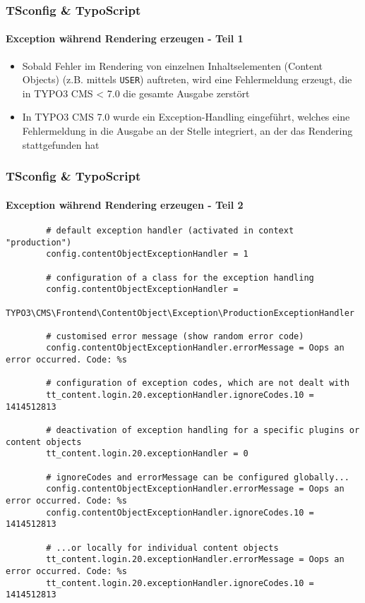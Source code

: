 \begin{frame}[fragile]
	\frametitle{TSconfig \& TypoScript}
	\framesubtitle{Exception während Rendering erzeugen - Teil 1}

	\begin{itemize}
		\item Sobald Fehler im Rendering von einzelnen Inhaltselementen (Content Objects) (z.B. mittels \texttt{USER}) auftreten, wird eine Fehlermeldung erzeugt, die in TYPO3 CMS < 7.0 die gesamte Ausgabe zerstört
		\item In TYPO3 CMS 7.0 wurde ein Exception-Handling eingeführt, welches eine Fehlermeldung in die Ausgabe an der Stelle integriert, an der das Rendering stattgefunden hat
	\end{itemize}

\end{frame}


\begin{frame}[fragile]
	\frametitle{TSconfig \& TypoScript}
	\framesubtitle{Exception während Rendering erzeugen - Teil 2}

	\lstset{
		basicstyle=\tiny\ttfamily
	}

	\begin{lstlisting}
		# default exception handler (activated in context "production")
		config.contentObjectExceptionHandler = 1

		# configuration of a class for the exception handling
		config.contentObjectExceptionHandler =
		  TYPO3\CMS\Frontend\ContentObject\Exception\ProductionExceptionHandler

		# customised error message (show random error code)
		config.contentObjectExceptionHandler.errorMessage = Oops an error occurred. Code: %s

		# configuration of exception codes, which are not dealt with
		tt_content.login.20.exceptionHandler.ignoreCodes.10 = 1414512813

		# deactivation of exception handling for a specific plugins or content objects
		tt_content.login.20.exceptionHandler = 0

		# ignoreCodes and errorMessage can be configured globally...
		config.contentObjectExceptionHandler.errorMessage = Oops an error occurred. Code: %s
		config.contentObjectExceptionHandler.ignoreCodes.10 = 1414512813

		# ...or locally for individual content objects
		tt_content.login.20.exceptionHandler.errorMessage = Oops an error occurred. Code: %s
		tt_content.login.20.exceptionHandler.ignoreCodes.10 = 1414512813
	\end{lstlisting}

\end{frame}


